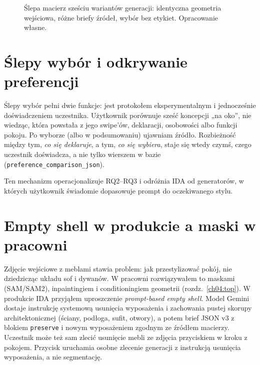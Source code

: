 \begin{figure}[htbp]
  \centering
  \caption{Ślepa macierz sześciu wariantów generacji: identyczna geometria wejściowa, różne briefy źródeł, wybór bez etykiet. Opracowanie własne.}
  \label{fig:ch07:matrix}
\end{figure}

\section{Ślepy wybór i odkrywanie preferencji}
\label{ch07:sec:slepy-wybor}

Ślepy wybór pełni dwie funkcje: jest protokołem eksperymentalnym i jednocześnie doświadczeniem uczestnika. Użytkownik porównuje sześć koncepcji „na oko”, nie wiedząc, która powstała z jego swipe'ów, deklaracji, osobowości albo funkcji pokoju.
Po wyborze (albo w podsumowaniu) ujawniam źródło. Rozbieżność między tym, \emph{co się deklaruje}, a tym, \emph{co się wybiera}, staje się wtedy czymś, czego uczestnik doświadcza, a nie tylko wierszem w bazie (\texttt{preference\_comparison\_json}).

Ten mechanizm operacjonalizuje RQ2--RQ3 i odróżnia IDA od generatorów, w których użytkownik świadomie dopasowuje prompt do oczekiwanego stylu.

\section{Empty shell w produkcie a maski w pracowni}
\label{ch07:sec:empty-shell}

Zdjęcie wejściowe z meblami stawia problem: jak przestylizować pokój, nie dziedzicząc układu sof i dywanów. W pracowni rozwiązywałem to maskami (SAM/SAM2), inpaintingiem i conditioningiem geometrii (rozdz.~\ref{ch04:top}).
W produkcie IDA przyjąłem uproszczenie \emph{prompt-based empty shell}. Model Gemini dostaje instrukcję systemową usunięcia wyposażenia i zachowania pustej skorupy architektonicznej (ściany, podłoga, sufit, otwory), a potem brief JSON v3 z blokiem \texttt{preserve} i nowym wyposażeniem zgodnym ze źródłem macierzy.
Uczestnik może też sam zlecić usunięcie mebli ze zdjęcia przyciskiem w kroku z pokojem. Przycisk uruchamia osobne zlecenie generacji z instrukcją usunięcia wyposażenia, a nie segmentację.

